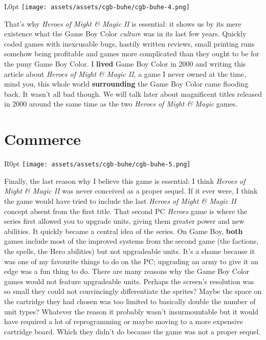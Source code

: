 \documentclass{book}
\begin{document}
\begin{wrapfigure}{L}{0pt} \texttt{[image: assets/assets/cgb-buhe/cgb-buhe-4.png]}\end{wrapfigure}
That’s why \emph{Heroes of Might \& Magic II} is essential: it shows us by its mere existence what the Game Boy Color \emph{culture} was in its last few years. Quickly coded games with inexcusable bugs, hastily written reviews, small printing runs somehow being profitable and games more complicated than they ought to be for the puny Game Boy Color. I \textbf{lived} Game Boy Color in 2000 and writing this article about \emph{Heroes of Might \& Magic II}, a game I never owned at the time, mind you, this whole world \textbf{surrounding} the Game Boy Color came flooding back. It wasn’t all bad though. We will talk later about magnificent titles released in 2000 around the same time as the two \emph{Heroes of Might \& Magic} games.

\FloatBarrier\needspace{5pt}\section*{Commerce}\nopagebreak[4]

\begin{wrapfigure}{R}{0pt} \texttt{[image: assets/assets/cgb-buhe/cgb-buhe-5.png]}\end{wrapfigure}
Finally, the last reason why I believe this game is essential: I think \emph{Heroes of Might \& Magic II} was never conceived as a proper sequel. If it ever were, I think the game would have tried to include the last \emph{Heroes of Might \& Magic II} concept absent from the first title. That second PC \emph{Heroes} game is where the series first allowed you to upgrade units, giving them greater power and new abilities. It quickly became a central idea of the series. On Game Boy, \textbf{both} games include most of the improved systems from the second game (the factions, the spells, the Hero abilities) but not upgradeable units. It’s a shame because it was one of my favourite things to do on the PC; upgrading an army to give it an edge was a fun thing to do. There are many reasons why the Game Boy Color games would not feature upgradeable units. Perhaps the screen’s resolution was so small they could not convincingly differentiate the sprites? Maybe the space on the cartridge they had chosen was too limited to basically double the number of unit types? Whatever the reason it probably wasn’t insurmountable but it would have required a lot of reprogramming or maybe moving to a more expensive cartridge board. Which they didn’t do because the game was not a proper sequel.
\end{document}
